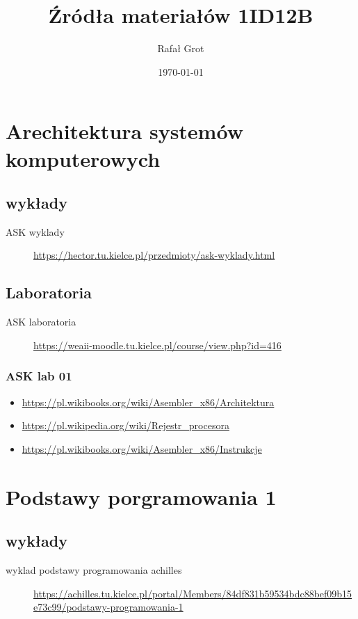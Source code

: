 \documentclass[11pt]{article}
\author{Rafał Grot}
\date{\today}
\title{Źródła materiałów 1ID12B}
\begin{document}
\maketitle
\tableofcontents


\section{Arechitektura systemów komputerowych}
\label{sec:org352cdcb}
\subsection{wykłady}
\label{sec:orgf29081d}
\begin{description}
\item[{ASK wyklady}] \url{https://hector.tu.kielce.pl/przedmioty/ask-wyklady.html}
\end{description}
\subsection{Laboratoria}
\label{sec:org421c453}
\begin{description}
\item[{ASK laboratoria}] \url{https://weaii-moodle.tu.kielce.pl/course/view.php?id=416}
\end{description}
\subsubsection{ASK lab 01}
\label{sec:org5bcbded}
\begin{itemize}
\item \url{https://pl.wikibooks.org/wiki/Asembler\_x86/Architektura}
\item \url{https://pl.wikipedia.org/wiki/Rejestr\_procesora}
\item \url{https://pl.wikibooks.org/wiki/Asembler\_x86/Instrukcje}
\end{itemize}

\section{Podstawy porgramowania 1}
\label{sec:orgebec486}
\subsection{wykłady}
\label{sec:orge1f2f87}
\begin{description}
\item[{wyklad podstawy programowania achilles}] \url{https://achilles.tu.kielce.pl/portal/Members/84df831b59534bdc88bef09b15e73c99/podstawy-programowania-1}
\end{description}
\end{document}
